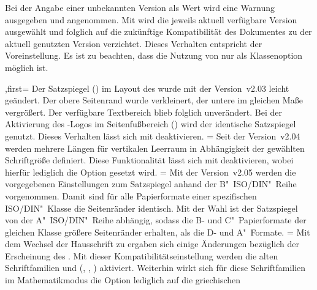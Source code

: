 \begin{DeclareEntity*}{}
\begin{DeclareEntity*}{}
\begin{DeclareEntity*}{}
\begin{Declaration}
Bei der Angabe einer unbekannten Version als Wert wird eine Warnung ausgegeben 
und  angenommen. Mit  wird die 
jeweils aktuell verfügbare Version ausgewählt und folglich auf die zukünftige 
Kompatibilität des Dokumentes zu der aktuell genutzten Version verzichtet. 
Dieses Verhalten entspricht der Voreinstellung. Es ist zu beachten, dass die 
Nutzung von  nur als Klassenoption möglich ist.
%
\begin{DeclareValues}
,first=
  Der Satzspiegel () im Layout des 
  \CDs wurde mit der Version~v2.03 leicht geändert. Der obere Seitenrand wurde 
  verkleinert, der untere im gleichen Maße vergrößert. Der verfügbare 
  Textbereich blieb folglich unverändert. Bei der Aktivierung des \DDC-Logos im 
  Seitenfußbereich () wird der 
  identische Satzspiegel genutzt. Dieses Verhalten lässt sich mit 
   deaktivieren.
=
  Seit der Version~v2.04 werden mehrere Längen für vertikalen Leerraum in 
  Abhängigkeit der gewählten Schriftgröße definiert. Diese Funktionalität lässt 
  sich mit  deaktivieren, wobei hierfür lediglich die 
  Option  gesetzt wird. 
=
  Mit der Version~v2.05 werden die vorgegebenen Einstellungen zum Satzspiegel 
  anhand der B"~ISO/DIN"~Reihe vorgenommen. Damit sind für alle Papierformate 
  einer spezifischen ISO/DIN"~Klasse die Seitenränder identisch. Mit der Wahl 
   ist der Satzspiegel von der A"~ISO/DIN"~Reihe 
  abhängig, sodass die B- und C"~Papierformate der gleichen Klasse größere 
  Seitenränder erhalten, als die D- und A"~Formate.
=
  Mit dem Wechsel der Hausschrift zu \OpenSans ergaben sich einige Änderungen 
  bezüglich der Erscheinung des \CDs. Mit dieser Kompatibilitätseinstellung 
  werden die alten Schriftfamilien \Univers und \DIN 
  (, , )
  aktiviert. Weiterhin wirkt sich für diese Schriftfamilien im Mathematikmodus 
  die Option  lediglich auf die griechischen 

\end{DeclareValues}
\end{Declaration}
\end{DeclareEntity*}
\end{DeclareEntity*}
\end{DeclareEntity*}
